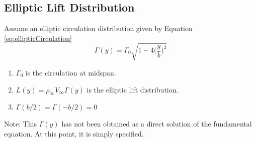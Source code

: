 \documentclass[draft=false, titlepage]{article}
\begin{document}
\subsection{Elliptic Lift Distribution}
Assume an elliptic circulation distribution given by Equation \ref{eq:ellipticCirculation}
\begin{equation}
    \Gamma(y) = \Gamma_0 \sqrt{1-4\Big( \frac{y}{b}\Big)^2}
    \label{eq:ellipticCirculation}
\end{equation}
\begin{enumerate}
    \item $\Gamma_0$ is the circulation at midspan.
    \item $L(y) = \rho_\infty V_\infty \Gamma(y)$ is the elliptic lift distribution.
    \item $\Gamma(b/2) = \Gamma(-b/2) = 0$
\end{enumerate}
Note: This $\Gamma(y)$ has not been obtained as a direct solution of the fundamental equation. At this point, it is simply specified.
\end{document}
